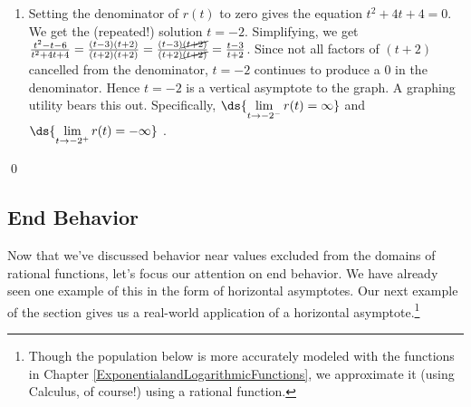 \documentclass{ximera}
\begin{document}
\begin{example}
\begin{enumerate}
\begin{center}
\end{center} 

\item  Setting the denominator of $r(t)$ to zero gives the equation $t^2+4t+4 = 0$.  We get  the (repeated!) solution $t=-2$.  Simplifying, we get  $\frac{t^2-t-6}{t^2+4t+4} = \frac{(t-3)(t+2)}{(t+2)(t+2)}  =  \frac{(t-3)\cancel{(t+2)}}{(t+2)\cancel{(t+2)}} =  \frac{t-3}{t+2}$.  Since  not all factors of $(t+2)$ cancelled from the denominator, $t=-2$ continues to produce a $0$ in the denominator.  Hence $t=-2$ is a vertical asymptote to the graph.  A graphing utility bears this out.  Specifically,     $\ds{\lim_{t \rightarrow -2^{-}} r(t) = \infty}$ and  $\ds{\lim_{t \rightarrow -2^{+}} r(t) = -\infty}$ .


\begin{center}
\end{center} 

\end{enumerate}
\qed
\end{example}

\subsection{End Behavior}
\label{ebrationalsection}

Now that we've  discussed behavior near values excluded from the domains of rational functions, let's focus our attention on  end behavior.  We have already seen one example of this in the form of horizontal asymptotes.  Our next example of the section gives us a real-world application of a horizontal asymptote.\footnote{Though the population below is more accurately modeled with the functions in Chapter \ref{ExponentialandLogarithmicFunctions}, we approximate it (using Calculus, of course!) using a rational function.}
\end{document}
